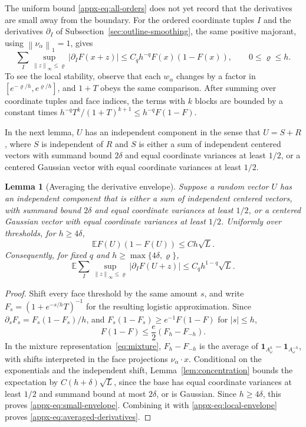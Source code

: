 \documentclass[11pt,letterpaper]{article}
\newif\ifshowrev
\newcommand{\rev}[1]{\ifshowrev{\color{revblue}%
\hypersetup{linkcolor=revblue,citecolor=revblue,urlcolor=revblue}#1}\else#1\fi}
\newcommand{\rs}[1]{\ifshowrev{\color{revblue}#1}\else#1\fi}
\newif\ifshowpass
\newcommand{\pass}[1]{\ifshowpass{\color{revblue}%
\hypersetup{linkcolor=revblue,citecolor=revblue,urlcolor=revblue}#1}\else#1\fi}
\newif\ifshowtrim
\newcommand{\trim}[1]{\ifshowtrim{\color{revblue}%
\hypersetup{linkcolor=revblue,citecolor=revblue,urlcolor=revblue}#1}\else#1\fi}
\newif\ifshowskill
\newcommand{\skl}[1]{\ifshowskill{\color{revblue}%
\hypersetup{linkcolor=revblue,citecolor=revblue,urlcolor=revblue}#1}\else#1\fi}
\newtheorem{lemma}{Lemma}
\theoremstyle{remark}
\newcommand{\E}{\mathbb E}
\newcommand{\norm}[1]{\left\lVert#1\right\rVert}
\newcommand{\ind}{\mathbf 1}
\begin{document}
The uniform bound \eqref{appx-eq:all-orders} does not yet record that the
derivatives are small away from the boundary. \trim{For the ordered
coordinate tuples \(I\) and the derivatives \(\partial_I\) of
Subsection~\ref{sec:outline-smoothing}, the} same positive majorant,
using \(\norm{\nu_\alpha}_1=1\), gives
\begin{equation}
 \sum_I\sup_{\norm z_\infty\le\rs\varrho}|\partial_IF(x+z)|
 \le C_qh^{-q}F(x)(1-F(x)),\qquad 0\le\rs\varrho\le h.
 \label{appx-eq:local-envelope}
\end{equation}
To see the local stability, \pass{observe that} each \(w_\alpha\)
changes by a factor in
\([e^{-\rs\varrho/h},e^{\rs\varrho/h}]\), and \(1+T\) obeys the same comparison.
After summing over coordinate tuples and face indices, the terms with
\(k\) blocks are bounded by a constant times
\(h^{-q}T^k/(1+T)^{k+1}\le h^{-q}F(1-F)\).

\skl{In the next lemma, \(U\) has an independent component in the sense
that \(U=S+R\), where \(S\) is independent of \(R\) and \(S\) is either a
sum of independent centered vectors with summand bound \(2\delta\) and
equal coordinate variances at least \(1/2\), or a centered Gaussian vector
with equal coordinate variances at least \(1/2\).}

\begin{lemma}[Averaging the derivative envelope]\label{appx-lem:envelope}
Suppose a random vector \(U\) has an independent component that is
either a sum of independent centered vectors, with summand bound
\(2\delta\) and equal coordinate variances at least \(1/2\), or a
centered Gaussian vector with equal coordinate variances at least
\(1/2\).
Uniformly over thresholds, for \(h\ge4\delta\),
\begin{equation}
 \E F(U)(1-F(U))\le Ch\sqrt L.
 \label{appx-eq:small-envelope}
\end{equation}
Consequently, for fixed \(q\) and \(h\ge\max\{4\delta,\rs\varrho\}\),
\begin{equation}
 \E\sum_I\sup_{\norm z_\infty\le\rs\varrho}|\partial_IF(U+z)|
 \le C_q h^{1-q}\sqrt L.
 \label{appx-eq:averaged-derivatives}
\end{equation}
\end{lemma}

\begin{proof}
Shift every face threshold by the same amount \(s\), and write
\(F_s=(1+e^{-s/h}T)^{-1}\) for the resulting logistic approximation. Since
\(\partial_sF_s=F_s(1-F_s)/h\), and
\(F_s(1-F_s)\ge e^{-1}F(1-F)\) for \(|s|\le h\),
\[
 F(1-F)\le\frac e2(F_h-F_{-h}).
\]
In the mixture representation~\trim{\eqref{eq:mixture}},
\(F_h-F_{-h}\) is the average of
\(\ind_{A_{\rs\omega}^h}-\ind_{A_{\rs\omega}^{-h}}\), with shifts interpreted in the
\trim{face projections \(\nu_\alpha\cdot x\)}. Conditional on the exponentials and the
independent shift, Lemma~\rev{\ref{lem:concentration}} bounds the expectation
by \(C(h+\delta)\sqrt L\)\pass{, since} the base has equal coordinate
variances
at least \(1/2\) and summand bound at most \(2\delta\), or is
Gaussian. Since \(h\ge4\delta\), this proves
\eqref{appx-eq:small-envelope}. Combining it with
\eqref{appx-eq:local-envelope} proves \eqref{appx-eq:averaged-derivatives}.
\end{proof}
\end{document}
